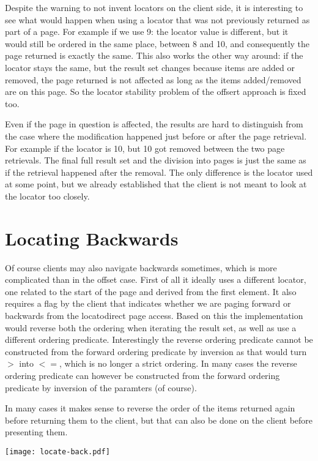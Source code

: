 \documentclass[11pt,a4paper]{article}
\begin{document}
\begin{multicols}{2}
Despite the warning to not invent locators on the client side, it is interesting 
to see what would happen when using a locator that was not previously returned as part of a page. For example 
if we use 9: the locator value is different, but it would still be ordered in the same
place, between 8 and 10, and consequently the page returned is exactly the same.
This also works the other way around: if the locator stays the same, but the
result set changes because items are added or removed, the page returned is not
affected as long as the items added/removed are on this page. So the locator
stability problem of the offsert approach is fixed too.

Even if the page in question is affected, the results are hard to distinguish
from the case where the modification happened just before or after the page
retrieval. For example if the locator is 10, but 10 got removed between the two
page retrievals. The final full result set and the division into pages is just
the same as if the retrieval happened after the removal. The only difference is
the locator used at some point, but we already established that the client is
not meant to look at the locator too closely.

\section*{Locating Backwards}

Of course clients may also navigate backwards sometimes, which is more
complicated than in the offset case. First of all it ideally uses a different
locator, one related to the start of the page and derived from the first
element. It also requires a flag by the client that indicates whether we are
paging forward or backwards from the locatodirect page access. Based on this the
implementation would reverse both the ordering when iterating the result set, as
well as use a different ordering predicate. Interestingly the reverse ordering
predicate cannot be constructed from the forward ordering predicate by inversion
as that would turn $>$ into $<=$, which is no longer a strict ordering. In many
cases the reverse ordering predicate can however be constructed from the forward
ordering predicate by inversion of the paramters (of course).

In many cases it makes sense to reverse the
order of the items returned again before returning them to the client, but that
can also be done on the client before presenting them. 

\texttt{[image: locate-back.pdf]}





\end{multicols}
\end{document}
